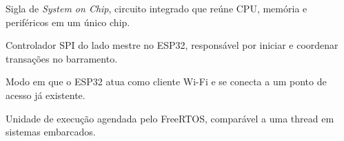 \begin{description}[
  font=\normalfont\bfseries,
  style=multiline,
  leftmargin=5.8cm,
  labelwidth=5.1cm,
  labelsep=0.35cm,
  itemsep=0.55\baselineskip
]
  \item[SoC] Sigla de \textit{System on Chip}, circuito integrado que reúne CPU, memória e periféricos em um único chip.
  \item[SPI Host] Controlador SPI do lado mestre no ESP32, responsável por iniciar e coordenar transações no barramento.
  \item[Station Mode] Modo em que o ESP32 atua como cliente Wi-Fi e se conecta a um ponto de acesso já existente.
  \item[Task] Unidade de execução agendada pelo FreeRTOS, comparável a uma thread em sistemas embarcados.
\end{description}
